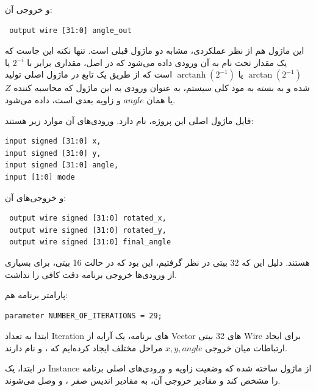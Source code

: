 \documentclass[12pt,titlepage,a4page , tikz , multi,table , svgnames,xcdraw]{article}
\DeclareMathOperator\arctanh{arctanh}
\begin{document}
و خروجی آن:

\begin{latin}
\begin{verbatim}
 output wire [31:0] angle_out
\end{verbatim}
\end{latin}

این ماژول هم از نظر عملکردی، مشابه دو ماژول قبلی است. تنها نکته این جاست که یک مقدار تحت نام  به آن ورودی داده می‌شود که در اصل، مقداری برابر با $2^{-i}$ یا $\arctan (2^{-1})$ یا
$\arctanh (2^{-1})$
است که از طریق یک تابع در ماژول اصلی تولید شده و به بسته به مود کلی سیستم، به عنوان ورودی به این ماژول که محاسبه کننده $Z$ یا همان $angle$ و زاویه بعدی است، داده می‌شود.

\hrulefill

فایل ماژول اصلی این پروژه،  نام دارد. ورودی‌های آن موارد زیر هستند:

\begin{latin}
\begin{verbatim}
input signed [31:0] x,
input signed [31:0] y,
input signed [31:0] angle,
input [1:0] mode
\end{verbatim}
\end{latin}

و خروجی‌های آن:

\begin{latin}
\begin{verbatim}
 output wire signed [31:0] rotated_x,
 output wire signed [31:0] rotated_y,
 output wire signed [31:0] final_angle
\end{verbatim}
\end{latin}

هستند. دلیل این که 32 بیتی در نظر گرفتیم، این بود که در حالت 16 بیتی، برای بسیاری از ورودی‌ها خروجی برنامه دقت کافی را نداشت.

پارامتر برنامه هم:

\begin{latin}
\begin{verbatim}
parameter NUMBER_OF_ITERATIONS = 29;
\end{verbatim}
\end{latin}


ابتدا به تعداد Iteration های برنامه، یک آرایه از Vector های 32 بیتی Wire برای ایجاد ارتباطات میان خروجی $x,y,angle$ مراحل مختلف ایجاد کرده‌ایم که ،  و  نام دارند.

در ابتدا، یک Instance از ماژول  ساخته شده که وضعیت زاویه و ورودی‌های اصلی برنامه را مشخص کند و مقادیر خروجی آن، به مقادیر اندیس صفر  ،  و  وصل می‌شوند.
\end{document}
